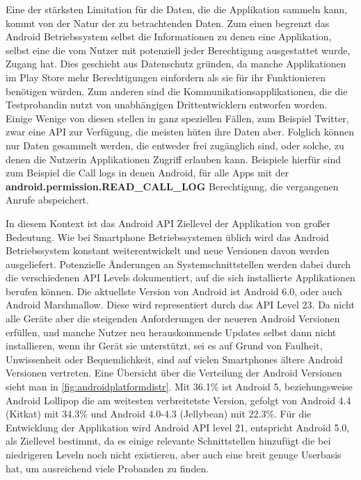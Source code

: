 Eine der stärksten Limitation für die Daten, die die Applikation sammeln kann, kommt von der Natur der zu betrachtenden Daten.
Zum einen begrenzt das Android Betriebssystem selbst die Informationen zu denen eine Applikation, selbst eine die vom Nutzer mit potenziell jeder Berechtigung ausgestattet wurde, Zugang hat.
Dies geschieht aus Datenschutz gründen, da manche Applikationen im Play Store mehr Berechtigungen einfordern als sie für ihr Funktionieren benötigen würden.
Zum anderen sind die Kommunikationsapplikationen, die die Testprobandin nutzt von unabhängigen Drittentwicklern entworfen worden.
Einige Wenige von diesen stellen in ganz speziellen Fällen, zum Beispiel Twitter\cite{twitterapi}, zwar eine API zur Verfügung, die meisten hüten ihre Daten aber.
Folglich können nur Daten gesammelt werden, die entweder frei zugänglich sind, oder solche, zu denen die Nutzerin Applikationen Zugriff erlauben kann.
Beispiele hierfür sind zum Beispiel die Call logs in denen Android, für alle Apps mit der \textbf{android.permission.READ\_CALL\_LOG} Berechtigung, die vergangenen Anrufe abspeichert.
\par

In diesem Kontext ist das Android API Ziellevel der Applikation von großer Bedeutung.
Wie bei Smartphone Betriebssystemen üblich wird das Android Betriebssystem konstant weiterentwickelt und neue Versionen davon werden ausgeliefert.
Potenzielle Änderungen an Systemschnittstellen werden dabei durch die verschiedenen API Levels dokumentiert, auf die sich installierte Applikationen berufen können.
Die aktuellste Version von Android ist Android 6.0, oder auch Android Marshmallow.
Diese wird representiert durch das API Level 23.
Da nicht alle Geräte aber die steigenden Anforderungen der neueren Android Versionen erfüllen, 
und manche Nutzer neu herauskommende Updates selbst dann nicht installieren, wenn ihr Gerät sie unterstützt, 
sei es auf Grund von Faulheit, Unwissenheit oder Bequemlichkeit, sind auf vielen Smartphones ältere Android Versionen vertreten.
Eine Übersicht über die Verteilung der Android Versionen sieht man in \ref{fig:androidplatformdistr}.
Mit 36.1\% ist Android 5, beziehungsweise Android Lollipop die am weitesten verbreitetste Version,
gefolgt von Android 4.4 (Kitkat) mit 34.3\% und Android 4.0-4.3 (Jellybean) mit 22.3\%\cite{androiddistr}.
Für die Entwicklung der Applikation wird Android API level 21, entspricht Android 5.0, als Ziellevel bestimmt, da es einige relevante Schnittstellen hinzufügt die bei niedrigeren Leveln noch nicht existieren, aber auch eine breit genuge Userbasis hat, um ausreichend viele Probanden zu finden.


